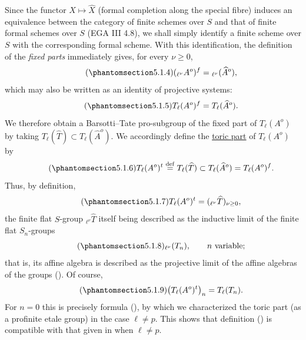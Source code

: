 Since the functor $X\longmapsto\widehat X$ (formal completion along the
special fibre) induces an equivalence between the category of finite
schemes over $S$ and that of finite formal schemes over $S$ (EGA III
4.8), we shall simply identify a finite scheme over $S$ with the
corresponding formal scheme.  With this identification, the definition
of the \emph{fixed parts} immediately gives, for every $\nu\geq0$,
\begin{equation}\tag{\SGARefTarget{sga7.sga7i.eix.n5-1-4}{5.1.4}}
 ({}_{\ell^\nu}A^o)^f={}_{\ell^\nu}(\widehat A^o),
\end{equation}
which may also be written as an identity of projective systems:
\begin{equation}\tag{\SGARefTarget{sga7.sga7i.eix.n5-1-5}{5.1.5}}
 T_\ell(A^o)^f=T_\ell(\widehat A^o).
\end{equation}
We therefore obtain a Barsotti--Tate pro-subgroup of the fixed part of
$T_\ell(A^o)$ by taking
$T_\ell(\widehat T)\subset T_\ell(\widehat A^o)$.  We accordingly
define the \underline{toric part} of $T_\ell(A^o)$ by
\begin{equation}\tag{\SGARefTarget{sga7.sga7i.eix.n5-1-6}{5.1.6}}
 T_\ell(A^o)^t
 \stackrel{\mathrm{def}}{=}
 T_\ell(\widehat T)
 \subset T_\ell(\widehat A^o)
 =T_\ell(A^o)^f.
\end{equation}
Thus, by definition,
\begin{equation}\tag{\SGARefTarget{sga7.sga7i.eix.n5-1-7}{5.1.7}}
 T_\ell(A^o)^t=({}_{\ell^\nu}\widehat T)_{\nu\geq0},
\end{equation}
the finite flat $S$-group ${}_{\ell^\nu}\widehat T$ itself being
described as the inductive limit of the finite flat $S_n$-groups
\begin{equation}\tag{\SGARefTarget{sga7.sga7i.eix.n5-1-8}{5.1.8}}
 {}_{\ell^\nu}(T_n),\qquad n\ \text{variable};
\end{equation}
that is, its affine algebra is described as the projective limit of the
affine algebras of the groups ().  Of course,
\begin{equation}\tag{\SGARefTarget{sga7.sga7i.eix.n5-1-9}{5.1.9}}
 \bigl(T_\ell(A^o)^t\bigr)_n=T_\ell(T_n).
\end{equation}
For $n=0$ this is precisely formula (), by which we characterized
the toric part (as a profinite etale group) in the case $\ell\neq p$.
This shows that definition () is compatible with that given in
 when $\ell\neq p$.

